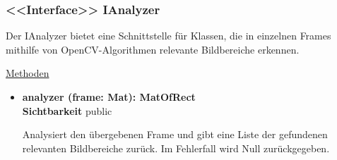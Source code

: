 \subsubsection{<<Interface>> IAnalyzer} \label{service:klasse:IAnalyzer}
Der IAnalyzer bietet eine Schnittstelle für Klassen, die in einzelnen Frames mithilfe von OpenCV-Algorithmen relevante Bildbereiche erkennen. \newline

\underline{Methoden}
\begin{itemize}
\itemsep0pt
\item \textbf{analyzer (frame: Mat): MatOfRect}\hfill\\
\textbf{Sichtbarkeit} public

Analysiert den übergebenen Frame und gibt eine Liste der gefundenen relevanten Bildbereiche zurück. Im Fehlerfall wird Null zurückgegeben.

\end{itemize}